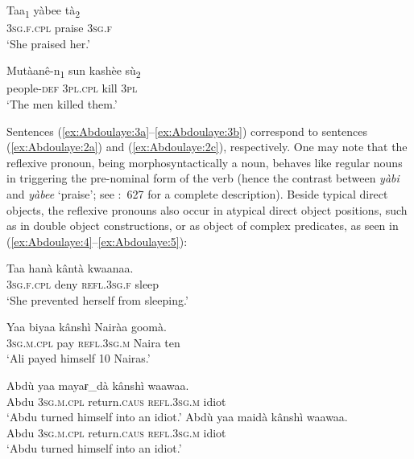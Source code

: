 \documentclass[output=paper]{langscibook}
\begin{document}
\ea%
    \label{ex:Abdoulaye:3}
    \ea  \label{ex:Abdoulaye:3a}
    \gll Taa\textsubscript{1}  yàbee  tà\textsubscript{2}\\
    \textsc{3sg.f.cpl}  praise  \textsc{3sg.f}\\
   \glt  `She praised her.’
   
    \ex  \label{ex:Abdoulaye:3b}
   \gll Mutàanê-n\textsubscript{1}  sun  kashèe sù\textsubscript{2}\\
    people-\textsc{def}  \textsc{3pl.cpl}  kill  \textsc{3pl}\\
    \glt `The men killed them.’
    \z
\z 
         
Sentences (\ref{ex:Abdoulaye:3a}--\ref{ex:Abdoulaye:3b}) correspond to sentences (\ref{ex:Abdoulaye:2a}) and (\ref{ex:Abdoulaye:2c}), respectively. One may note that the reflexive pronoun, being morphosyntactically a noun, behaves like regular nouns in triggering the pre-nominal form of the verb (hence the contrast between \textit{yàbi} and \textit{yàbee} ‘praise’; see \citealt{Newman2000}:~627 for a complete description). Beside typical direct objects, the reflexive pronouns also occur in atypical direct object positions, such as in double object constructions, or as object of complex predicates, as seen in (\ref{ex:Abdoulaye:4}--\ref{ex:Abdoulaye:5}):

\ea%
    \label{ex:Abdoulaye:4}
    \ea  \label{ex:Abdoulaye:4a}
    \gll  Taa  hanà  kântà  kwaanaa.\\
    \textsc{3sg.f.cpl}  deny  \textsc{refl.3sg.f}  sleep\\
    \glt  `She prevented herself from sleeping.’
    
    \ex \label{ex:Abdoulaye:4b}
    \gll  Yaa  biyaa  kânshì  Nairàa  goomà.\\
    \textsc{3sg.m.cpl}  pay  \textsc{refl.3sg.m}  Naira  ten\\
    \glt `Ali payed himself 10 Nairas.’
    \z
\z 


\ea%
    \label{ex:Abdoulaye:5}
    \ea \label{ex:Abdoulaye:5a}
   \gll Abdù  yaa  mayaɍ\_dà  kânshì  waawaa.\\
    Abdu  \textsc{3sg.m.cpl}  return.\textsc{caus}  \textsc{refl.3sg.m}  idiot\\
   \glt `Abdu turned himself into an idiot.’
    \ex \label{ex:Abdoulaye:5b}
    \gll Abdù  yaa  maidà  kânshì  waawaa.\\
    Abdu  \textsc{3sg.m.cpl}  return.\textsc{caus}  \textsc{refl.3sg.m}  idiot\\
    \glt `Abdu turned himself into an idiot.’
    \z
\z 
\end{document}
